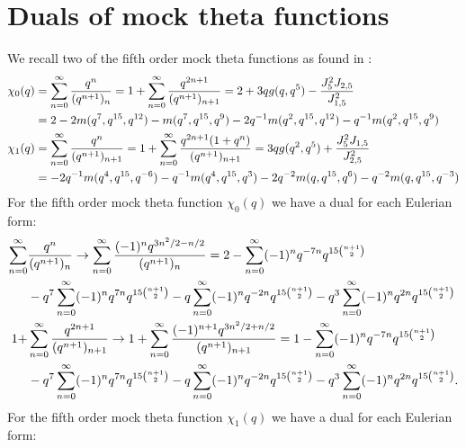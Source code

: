 \documentclass[12pt,reqno]{amsart}
\theoremstyle{remark}
\theoremstyle{definition}
\numberwithin{theorem}{section} \numberwithin{equation}{section}
\numberwithin{example}{section}
\begin{document}
\section{Duals of mock theta functions}\label{section:mock}
We recall two of the fifth order mock theta functions as found in \cite[Section $4$]{HM}:
\begin{align}
\chi_0(q)&=\sum_{n= 0}^{\infty}\frac{q^n}{(q^{n+1})_n}=1+\sum_{n=0}^{\infty}\frac{q^{2n+1}}{(q^{n+1})_{n+1}}=2+3qg(q,q^5)-\frac{J_5^2J_{2,5}}{J_{1,5}^2}\label{equation:mock-chi0-5th}\\
&=2-2m(q^7,q^{15},q^{12})-m(q^7,q^{15},q^9)-2q^{-1}m(q^2,q^{15},q^{12})-q^{-1}m(q^2,q^{15},q^9)\notag\\
\chi_1(q)&=\sum_{n= 0}^{\infty}\frac{q^n}{(q^{n+1})_{n+1}}=1+\sum_{n= 0}^{\infty}\frac{q^{2n+1}(1+q^n)}{(q^{n+1})_{n+1}}=3qg(q^2,q^5)+\frac{J_5^2J_{1,5}}{J_{2,5}^2}\label{equation:mock-chi1-5th}\\
&=-2q^{-1}m(q^4,q^{15},q^{-6})-q^{-1}m(q^4,q^{15},q^3)-2q^{-2}m(q,q^{15},q^{6})-q^{-2}m(q,q^{15},q^{-3})\notag
\end{align}
For the fifth order mock theta function $\chi_0(q)$ we have a dual for each Eulerian form:
\begin{align}
\sum_{n= 0}^{\infty}&\frac{q^n}{(q^{n+1})_n}
\rightarrow \sum_{n= 0}^{\infty}\frac{(-1)^nq^{3n^2/2-n/2}}{(q^{n+1})_n}=2-\sum_{n=0}^{\infty}(-1)^nq^{-7n}q^{15\binom{n+1}{2}}\notag\\
&-q^7\sum_{n=0}^{\infty}(-1)^nq^{7n}q^{15\binom{n+1}{2}} -q\sum_{n=0}^{\infty}(-1)^nq^{-2n}q^{15\binom{n+1}{2}}-q^3\sum_{n=0}^{\infty}(-1)^nq^{2n}q^{15\binom{n+1}{2}}\label{equation:mock-chi0-5th-dualA}\\
1+&\sum_{n= 0}^{\infty}\frac{q^{2n+1}}{(q^{n+1})_{n+1}}
\rightarrow 1+\sum_{n= 0}^{\infty}\frac{(-1)^{n+1}q^{3n^2/2+n/2}}{(q^{n+1})_{n+1}}=1-\sum_{n=0}^{\infty}(-1)^nq^{-7n}q^{15\binom{n+1}{2}}\notag\\
&-q^7\sum_{n=0}^{\infty}(-1)^nq^{7n}q^{15\binom{n+1}{2}} -q\sum_{n=0}^{\infty}(-1)^nq^{-2n}q^{15\binom{n+1}{2}}-q^3\sum_{n=0}^{\infty}(-1)^nq^{2n}q^{15\binom{n+1}{2}}.\label{equation:mock-chi0-5th-dualB}
\end{align}
For the fifth order mock theta function $\chi_1(q)$ we have a dual for each Eulerian form:
\end{document}
